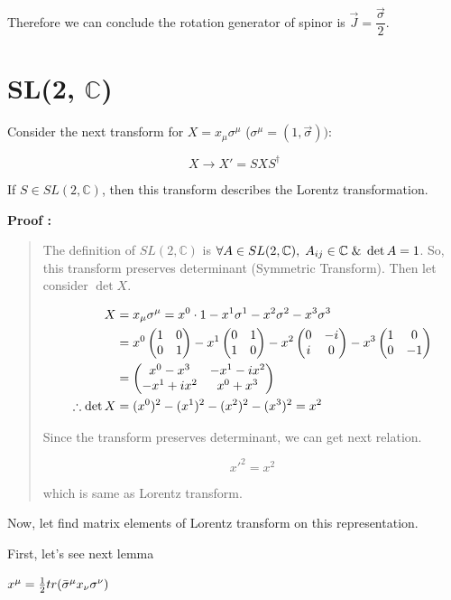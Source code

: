 \documentclass[11pt,letterpaper]{article}
\begin{document}
Therefore we can conclude the rotation generator of spinor is $\vec{J} = \dfrac{\vec{\sigma}}{2}$.

\newpage

\section{SL(2, $\mathbb{C}$)}

Consider the next transform for $X = x_\mu \sigma^\mu$ ($\sigma^{\mu} = (1, \vec{\sigma}))$: 

\begin{equation}
 X \rightarrow X' = SXS^{\dagger}
\end{equation}

\vs

If $S\in SL(2,\mathbb{C})$, then this transform describes the Lorentz transformation.

\VS

\textbf{Proof :}

\begin{quote}

The definition of $SL(2,\mathbb{C})$ is \hs $\forall A \in SL(2,\mathbb{C}),\hspace{0.1cm} A_{ij} \in \mathbb{C} \hspace{0.1cm} \& \hspace{0.1cm} \det{A} = 1$.
So, this transform preserves determinant (Symmetric Transform). Then let consider $\det{X}$.

\begin{align}
 X &= x_\mu \sigma^{\mu} = x^0 \cdot 1 - x^1 \sigma^1 - x^2 \sigma^2 -x^3 \sigma^3 \\
    &= x^0 \begin{pmatrix} 1 & 0 \\ 0 & 1 \end{pmatrix} - x^1 \begin{pmatrix} 0 & 1 \\ 1 & 0 \end{pmatrix} - x^2 \begin{pmatrix} 0 & -i \\ i & 0 \end{pmatrix} -x^3\begin{pmatrix} 1 & 0 \\ 0 & -1 \end{pmatrix} \\
    &=
    \begin{pmatrix}
     x^0 - x^3 & -x^1 - ix^2 \\
     -x^1 + ix^2 & x^0 + x^3
    \end{pmatrix} \\
 \therefore \det{X} &= (x^0)^2 - (x^1)^2 - (x^2)^2 - (x^3)^2 = x^2
\end{align} 

\VS

Since the transform preserves determinant, we can get next relation.

\begin{equation}
 x'^2 = x^2
\end{equation}

\vs

which is same as Lorentz transform.
\end{quote}

\vs

Now, let find matrix elements of Lorentz transform on this representation.

First, let's see next lemma

\begin{lemma}
   $ x^\mu = \frac{1}{2}tr(\bar{\sigma}^\mu x_\nu \sigma^\nu)$
\end{lemma}

\end{document}
